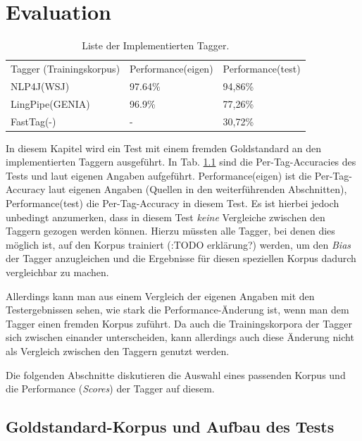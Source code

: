 %
\chapter{Evaluation}
\label{sec:eval}



\begin{table}[htb]
\centering
\begin{tabular}{l|l|l}
Tagger (Trainingskorpus) & Performance(eigen) & Performance(test)  \\
\cline{1-3}
NLP4J(WSJ)  & 97.64\% & 94,86\%	\\
LingPipe(GENIA) & 96.9\% & 77,26\%	\\
FastTag(-) & - & 30,72\%          
\end{tabular}
\vspace{3mm}
\caption{Liste der Implementierten Tagger. }
\label{sec:eval:list}
\end{table}

In diesem Kapitel wird ein Test mit einem fremden Goldstandard an den implementierten Taggern ausgeführt. In Tab. \ref{sec:eval:list} sind die Per-Tag-Accuracies des Tests und laut eigenen Angaben aufgeführt. Performance(eigen) ist die Per-Tag-Accuracy laut eigenen Angaben (Quellen in den weiterführenden Abschnitten), Performance(test) die Per-Tag-Accuracy in diesem Test. Es ist hierbei jedoch unbedingt anzumerken, dass in diesem Test \textit{keine} Vergleiche zwischen den Taggern gezogen werden können. Hierzu müssten alle Tagger, bei denen dies möglich ist, auf den Korpus trainiert (:TODO erklärung?) werden, um den \textit{Bias} der Tagger anzugleichen und die Ergebnisse für diesen speziellen Korpus dadurch vergleichbar zu machen.

Allerdings kann man aus einem Vergleich der eigenen Angaben mit den Testergebnissen sehen, wie stark die Performance-Änderung ist, wenn man dem Tagger einen fremden Korpus zuführt. Da auch die Trainingskorpora der Tagger sich zwischen einander unterscheiden, kann allerdings auch diese Änderung nicht als Vergleich zwischen den Taggern genutzt werden.

Die folgenden Abschnitte diskutieren die Auswahl eines passenden Korpus und die Performance (\textit{Scores}) der Tagger auf diesem.

\section{Goldstandard-Korpus und Aufbau des Tests}
\label{sec:eval:corpus}

